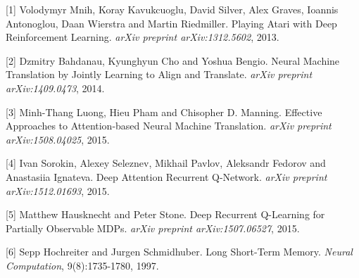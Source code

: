 \documentclass{article}
\begin{document}
[1] Volodymyr Mnih, Koray Kavukcuoglu, David Silver, Alex Graves, Ioannis Antonoglou, Daan Wierstra and Martin Riedmiller. Playing Atari with Deep Reinforcement Learning. {\it arXiv preprint arXiv:1312.5602}, 2013.

[2] Dzmitry Bahdanau, Kyunghyun Cho and Yoshua Bengio. Neural Machine Translation by Jointly Learning to Align and Translate. {\it arXiv preprint arXiv:1409.0473}, 2014.

[3] Minh-Thang Luong, Hieu Pham and Chisopher D. Manning. Effective Approaches to Attention-based Neural Machine Translation. {\it arXiv preprint arXiv:1508.04025}, 2015.

[4] Ivan Sorokin, Alexey Seleznev, Mikhail Pavlov, Aleksandr Fedorov and Anastasiia Ignateva. Deep Attention Recurrent Q-Network. {\it arXiv preprint arXiv:1512.01693}, 2015.

[5] Matthew Hausknecht and Peter Stone. Deep Recurrent Q-Learning for Partially Observable MDPs. {\it arXiv preprint arXiv:1507.06527}, 2015.

[6] Sepp Hochreiter and Jurgen Schmidhuber. Long Short-Term Memory. {\it Neural Computation}, 9(8):1735-1780, 1997.
\end{document}
